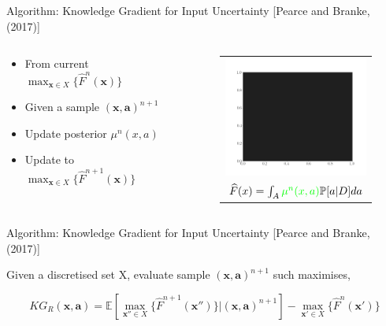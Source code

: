 \documentclass{beamer}
\begin{document}
\begin{frame}[fragile,t]{Algorithm: Knowledge Gradient for Input Uncertainty}
[Pearce and Branke, (2017)]

\begin{columns}
	\begin{column}{0.6\textwidth}
		\begin{itemize}
			\item From current $\max_{\mathbf{x} \in X}\{\widehat{F}^n(\mathbf{x})\}$
			\vspace{5mm}
			\item Given a sample $(\mathbf{x},\mathbf{a})^{n+1}$
			\vspace{5mm}
			\item Update posterior $\mu^{n}(x,a)$
			\vspace{5mm}
			\item Update to $\max_{\mathbf{x} \in X}\{\widehat{F}^{n+1}(\mathbf{x})\}$
		\end{itemize}
	\end{column}

	\begin{column}{0.5\textwidth}  %
		\begin{figure}
			\centering
			\begin{tabular}{c}
				\includegraphics[width=5.5cm]{FILLING.png}\\
				$\widehat{F}(x) = \int_{A} \textcolor{green}{\mu^{n} (x,a)} \mathbb{P}[a|D]da$\\
			\end{tabular}
		\end{figure}
	\end{column}
\end{columns}

\end{frame}

\begin{frame}{Algorithm: Knowledge Gradient for Input Uncertainty}
[Pearce and Branke, (2017)]

Given a discretised set X, evaluate sample $(\mathbf{x},\mathbf{a})^{n+1}$ such maximises,

$$KG_{R}(\mathbf{x},\mathbf{a}) = \mathbb{E}[\max_{\mathbf{x}'' \in X}\{\hat{F}^{n+1}(\mathbf{x}'')\}|(\mathbf{x},\mathbf{a})^{n+1}]-\max_{\mathbf{x}'\in X}\{\hat{F}^n(\mathbf{x}')\}$$
\end{frame}
\end{document}
